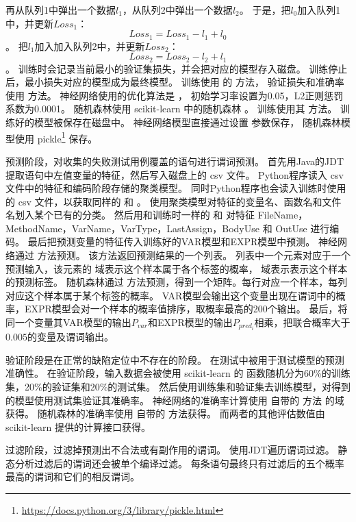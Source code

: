 再从队列1中弹出一个数据$l_1$，从队列2中弹出一个数据$l_2$。
于是，把$l_0$加入队列1中，并更新$Loss_1$：
$$
Loss_1 = Loss_1 - l_1 + l_0
$$。
把$l_1$加入加入队列2中，并更新$Loss_2$：
$$
Loss_2 = Loss_2 - l_2 + l_1
$$。
训练时会记录当前最小的验证集损失，并会把对应的模型存入磁盘。
训练停止后，最小损失对应的模型成为最终模型。
训练使用  的  方法，
验证损失和准确率使用  方法。
神经网络使用的优化算法是 ，
初始学习率设置为0.05，L2正则惩罚系数为0.0001。
随机森林使用 scikit-learn 中的随机森林  。
训练使用其  方法。
训练好的模型被保存在磁盘中。
神经网络模型直接通过设置  参数保存，
随机森林模型使用 pickle\footnote{\url{https://docs.python.org/3/library/pickle.html}} 保存。

预测阶段，对收集的失败测试用例覆盖的语句进行谓词预测。
首先用Java的JDT提取语句中左值变量的特征，然后写入磁盘上的 csv 文件。
Python程序读入 csv 文件中的特征和编码阶段存储的聚类模型。
同时Python程序也会读入训练时使用的 csv 文件，以获取同样的  和 。
使用聚类模型对特征的变量名、函数名和文件名划入某个已有的分类。
然后用和训练时一样的  和  对特征 FileName，MethodName，VarName，VarType，LastAssign，BodyUse
和 OutUse 进行编码。
最后把预测变量的特征传入训练好的VAR模型和EXPR模型中预测。
神经网络通过  方法预测。
该方法返回预测结果的一个列表。
列表中一个元素对应于一个预测输入，该元素的  域表示这个样本属于各个标签的概率，
 域表示表示这个样本的预测标签。
随机森林通过  方法预测，得到一个矩阵。每行对应一个样本，每列对应这个样本属于某个标签的概率。
VAR模型会输出这个变量出现在谓词中的概率，EXPR模型会对一个样本的概率值排序，取概率最高的200个输出。
最后，将同一个变量其VAR模型的输出$P_{var}$和EXPR模型的输出$P_{pred_i}$相乘，把联合概率大于$0.005$的变量及谓词输出。

验证阶段是在正常的缺陷定位中不存在的阶段。
在测试中被用于测试模型的预测准确性。
在验证阶段，输入数据会被使用 scikit-learn 的  函数随机分为60\%的训练集，20\%的验证集和20\%的测试集。
然后使用训练集和验证集去训练模型，对得到的模型使用测试集验证其准确率。
神经网络的准确率计算使用  自带的  方法
的域  获得。
随机森林的准确率使用  自带的  方法获得。
而两者的其他评估数值由 scikit-learn 提供的计算接口获得。

过滤阶段，过滤掉预测出不合法或有副作用的谓词。
使用JDT遍历谓词过滤。
静态分析过滤后的谓词还会被单个编译过滤。
每条语句最终只有过滤后的五个概率最高的谓词和它们的相反谓词。

